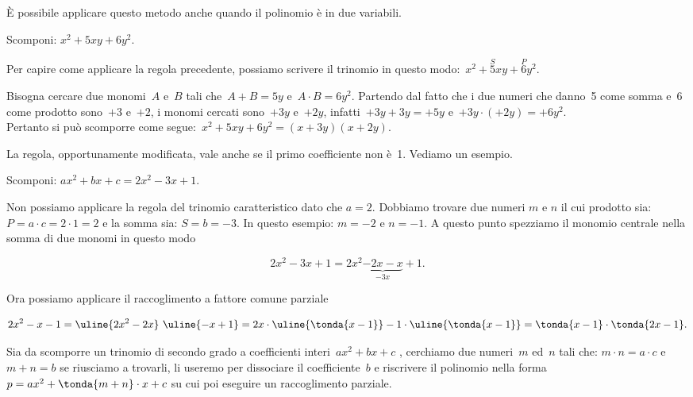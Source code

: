 È possibile applicare questo metodo anche quando il
polinomio è in due variabili.

\begin{esempio}{}{}
Scomponi: \(x^2+5xy+6y^{2}\).

Per capire come applicare la regola precedente, possiamo scrivere il
trinomio in questo modo:~\(x^2+\overset{S}{5}xy+\overset{P}{6}y{^{2}}\).

Bisogna cercare due monomi~\(A\) e~\(B\) tali che~\(A+B=5y\)
e~\(A\cdot B=6y^{2}\). Partendo dal fatto che i due numeri che danno~5
come somma e~6 come prodotto sono~\(+3\) e~\(+2\), i monomi cercati 
sono~\(+3y\) e~\(+2y\), infatti~\(+3y+3y=+5y\) 
e~\(+3y\cdot (+2y)=+6y^{2}\).\\
Pertanto si può scomporre come segue:~\(x^2+5xy+6y^{2}=(x+3y)(x+2y)\).
\end{esempio}

La regola, opportunamente modificata, vale anche se il primo
coefficiente non è~1. Vediamo un esempio.

\begin{esempio}{}{}
Scomponi: \(ax^2+bx+c=2x^2-3x+1\).

Non possiamo applicare la regola del trinomio caratteristico dato che 
\(a=2\).
Dobbiamo trovare due numeri \(m\) e \(n\) il cui prodotto sia: 
\(P = a \cdot c = 2 \cdot 1 = 2\) e la somma sia: \(S = b = -3\).
In questo esempio: \(m = -2\) e \(n = -1\).
A questo punto spezziamo il monomio centrale nella somma di due monomi in 
questo modo

\vspace{-1.0em}
\[2x^2-3x+1=2x^2\underbrace{-2x-x}_{-3x}+1.\]

Ora possiamo applicare il raccoglimento a fattore comune parziale

\vspace{-1.0em}
\[2x^2-x-1=
\uline{2x^2-2x}~\uline{-x+1}=
2x \cdot \uline{\tonda{x-1}}-1 \cdot \uline{\tonda{x-1}}=
\tonda{x-1}\cdot \tonda{2x-1}.\]
\end{esempio}

\begin{procedura}{}{}
Sia da scomporre un trinomio di secondo grado a coefficienti 
interi~\(ax^2+bx+c\)
, cerchiamo due numeri~\(m\) ed~\(n\) tali che: \quad 
\(m \cdot n = a \cdot c\) \quad 
e \quad 
\(m+n=b\)  \quad
se riusciamo a trovarli, li useremo per dissociare
il coefficiente~\(b\) e riscrivere il polinomio nella 
forma~\(p=ax^2+\tonda{m+n}\cdot x+c\)
su cui poi eseguire un raccoglimento parziale.
\end{procedura}


